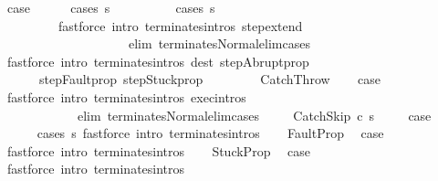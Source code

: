 \begin{isabellebody}
\ {\isacharquery}case\isanewline
\ \ \ \ \isamarkupfalse%
\ {\isacharparenleft}cases\ s{\isacharparenright}\isanewline
\ \ \ \ \isamarkupfalse%
\ \ \ \ \ {\isacharparenleft}cases\ s{\isacharprime}{\isacharparenright}\isanewline
\ \ \ \ \isamarkupfalse%
\ \ \ \ \ \ \ \ \ {\isacharparenleft}fastforce\ intro{\isacharcolon}\ terminates{\isachardot}intros\ step{\isacharunderscore}extend\ \isanewline
\ \ \ \ \ \ \ \ \ \ \ \ \ \ \ \ \ \ \ \ elim{\isacharcolon}\ terminates{\isacharunderscore}Normal{\isacharunderscore}elim{\isacharunderscore}cases{\isacharparenright}\isanewline
\ \ \ \ \isamarkupfalse%
\ {\isacharparenleft}fastforce\ intro{\isacharcolon}\ terminates{\isachardot}intros\ dest{\isacharcolon}\ step{\isacharunderscore}Abrupt{\isacharunderscore}prop\ \isanewline
\ \ \ \ \ \ step{\isacharunderscore}Fault{\isacharunderscore}prop\ step{\isacharunderscore}Stuck{\isacharunderscore}prop{\isacharparenright}{\isacharplus}\isanewline
\ \ \ \ \isamarkupfalse%
\isanewline
{}\isamarkupfalse%
\isanewline
\ \ \isamarkupfalse%
\ CatchThrow\isanewline
\ \ \isamarkupfalse%
\ {\isacharquery}case\ \isanewline
\ \ \ \isamarkupfalse%
\ {\isacharparenleft}fastforce\ intro{\isacharcolon}\ terminates{\isachardot}intros\ exec{\isachardot}intros\isanewline
\ \ \ \ \ \ \ \ \ \ \ \ elim{\isacharcolon}\ terminates{\isacharunderscore}Normal{\isacharunderscore}elim{\isacharunderscore}cases\ {\isacharparenright}\isanewline
{}\isamarkupfalse%
\isanewline
\ \ \isamarkupfalse%
\ {\isacharparenleft}CatchSkip\ c\ s{\isacharparenright}\ \isanewline
\ \ \isamarkupfalse%
\ {\isacharquery}case\ \isanewline
\ \ \ \ \isamarkupfalse%
\ {\isacharparenleft}cases\ s{\isacharparenright}\ {\isacharparenleft}fastforce\ intro{\isacharcolon}\ terminates{\isachardot}intros{\isacharparenright}{\isacharplus}\isanewline
{}\isamarkupfalse%
\isanewline
\ \ \isamarkupfalse%
\ FaultProp\ \isamarkupfalse%
\ {\isacharquery}case\ \isamarkupfalse%
\ {\isacharparenleft}fastforce\ intro{\isacharcolon}\ terminates{\isachardot}intros{\isacharparenright}\isanewline
{}\isamarkupfalse%
\isanewline
\ \ \isamarkupfalse%
\ StuckProp\ \isamarkupfalse%
\ {\isacharquery}case\ \isamarkupfalse%
\ {\isacharparenleft}fastforce\ intro{\isacharcolon}\ terminates{\isachardot}intros{\isacharparenright}\isanewline

\end{isabellebody}
